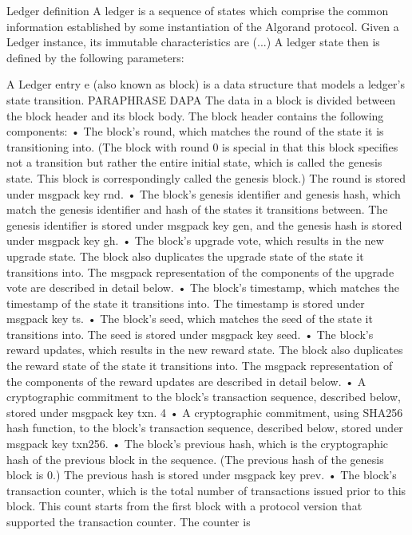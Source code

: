 \documentclass[10pt,a4paper]{article}
\begin{document}
\begin{section}{Ledger definition}
A ledger is a sequence of states which comprise the common information established by some instantiation of the Algorand protocol. 
Given a Ledger instance, its immutable characteristics are (...)
A ledger state then is defined by the following parameters:

A Ledger entry e (also known as block) is a data structure that models a ledger's state transition.
PARAPHRASE DAPA
The data in a block is divided between the block header and its block body. The block
header contains the following components:
• The block’s round, which matches the round of the state it is transitioning
into. (The block with round 0 is special in that this block specifies not a
transition but rather the entire initial state, which is called the genesis
state. This block is correspondingly called the genesis block.) The round is
stored under msgpack key rnd.
• The block’s genesis identifier and genesis hash, which match the genesis
identifier and hash of the states it transitions between. The genesis identifier
is stored under msgpack key gen, and the genesis hash is stored under
msgpack key gh.
• The block’s upgrade vote, which results in the new upgrade state. The
block also duplicates the upgrade state of the state it transitions into.
The msgpack representation of the components of the upgrade vote are
described in detail below.
• The block’s timestamp, which matches the timestamp of the state it
transitions into. The timestamp is stored under msgpack key ts.
• The block’s seed, which matches the seed of the state it transitions into.
The seed is stored under msgpack key seed.
• The block’s reward updates, which results in the new reward state. The
block also duplicates the reward state of the state it transitions into. The
msgpack representation of the components of the reward updates are
described in detail below.
• A cryptographic commitment to the block’s transaction sequence, described
below, stored under msgpack key txn.
4
• A cryptographic commitment, using SHA256 hash function, to the block’s
transaction sequence, described below, stored under msgpack key txn256.
• The block’s previous hash, which is the cryptographic hash of the previous
block in the sequence. (The previous hash of the genesis block is 0.) The
previous hash is stored under msgpack key prev.
• The block’s transaction counter, which is the total number of transactions
issued prior to this block. This count starts from the first block with a
protocol version that supported the transaction counter. The counter is

\end{section}
\end{document}

